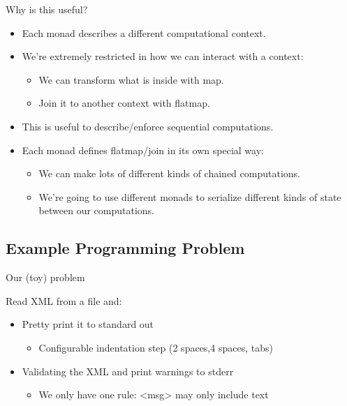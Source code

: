 \documentclass[professionalFonts,aspectratio=169]{beamer}
\begin{document}
\begin{frame}{Why is this useful?}
\begin{itemize}
  \pause \item Each monad describes a different computational context.
  \pause \item We're extremely restricted in how we can interact with a context:
    \begin{itemize}
      \pause \item We can transform what is inside with map.
      \pause \item Join it to another context with flatmap.
    \end{itemize}
  \pause \item This is useful to describe/enforce sequential computations.
  \pause \item Each monad defines flatmap/join in its own special way:
    \begin{itemize}
      \pause \item We can make lots of different kinds of chained computations.
      \pause \item We're going to use different monads to serialize different kinds of state between our computations.
    \end{itemize}
\end{itemize}
\end{frame}

\subsection{Example Programming Problem}
\begin{frame}{Our (toy) problem}

Read XML from a file and:

\begin{itemize}
\pause \item Pretty print it to standard out \begin{itemize}
\item Configurable indentation step (2 spaces,4 spaces, tabs)
\end{itemize}
\pause \item Validating the XML and print warnings to stderr \begin{itemize}
\item We only have one rule: <msg> may only include text
\end{itemize}
\end{itemize}

\end{frame}
\end{document}
